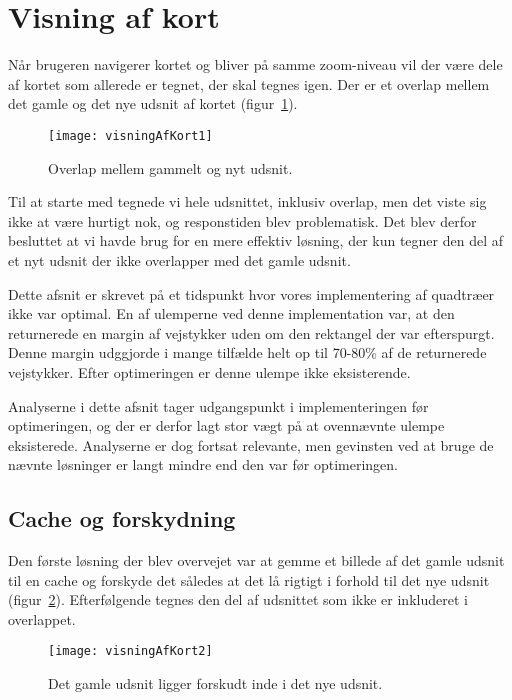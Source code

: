 \section{Visning af kort}
\label{sec:visningAfKort}

Når brugeren navigerer kortet og bliver på samme zoom-niveau vil der være dele af kortet som allerede er tegnet, der skal tegnes igen. Der er et overlap mellem det gamle og det nye udsnit af kortet (figur~\ref{figur:visningAfKort1}).

\begin{figure}[h]
	\centering
	\texttt{[image: visningAfKort1]}
	\captionsetup{width=0.8\textwidth}
	\caption{Overlap mellem gammelt og nyt udsnit.}
	\label{figur:visningAfKort1}
\end{figure}

Til at starte med tegnede vi hele udsnittet, inklusiv overlap, men det viste sig ikke at være hurtigt nok, og responstiden blev problematisk. Det blev derfor besluttet at vi havde brug for en mere effektiv løsning, der kun tegner den del af et nyt udsnit der ikke overlapper med det gamle udsnit.

Dette afsnit er skrevet på et tidspunkt hvor vores implementering af quadtræer ikke var optimal. En af ulemperne ved denne implementation var, at den returnerede en margin af vejstykker uden om den rektangel der var efterspurgt. Denne margin udggjorde i mange tilfælde helt op til 70-80\% af de returnerede vejstykker. Efter optimeringen er denne ulempe ikke eksisterende.

Analyserne i dette afsnit tager udgangspunkt i implementeringen før optimeringen, og der er derfor lagt stor vægt på at ovennævnte ulempe eksisterede. Analyserne er dog fortsat relevante, men gevinsten ved at bruge de nævnte løsninger er langt mindre end den var før optimeringen.

\subsection{Cache og forskydning}
\label{subsec:cacheOgForskydning}

Den første løsning der blev overvejet var at gemme et billede af det gamle udsnit til en cache og forskyde det således at det lå rigtigt i forhold til det nye udsnit (figur~\ref{figur:visningAfKort2}). Efterfølgende tegnes den del af udsnittet som ikke er inkluderet i overlappet.

\begin{figure}[h]
	\centering
	\texttt{[image: visningAfKort2]}
	\captionsetup{width=0.8\textwidth}
	\caption{Det gamle udsnit ligger forskudt inde i det nye udsnit.}
	\label{figur:visningAfKort2}
\end{figure}

